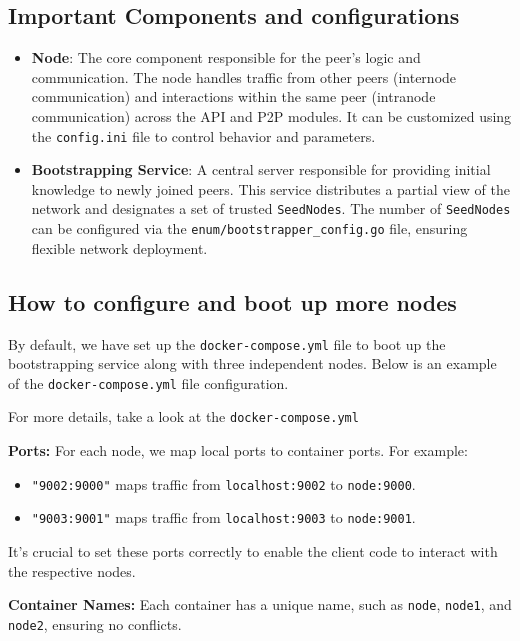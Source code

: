 \subsection{Important Components and configurations}

\begin{itemize}
    \item \textbf{Node}: The core component responsible for the peer's logic and communication. The node handles traffic from other peers (internode communication) and interactions within the same peer (intranode communication) across the API and P2P modules. It can be customized using the \texttt{config.ini} file to control behavior and parameters.

    \item \textbf{Bootstrapping Service}: A central server responsible for providing initial knowledge to newly joined peers. This service distributes a partial view of the network and designates a set of trusted \texttt{SeedNodes}. The number of \texttt{SeedNodes} can be configured via the \texttt{enum/bootstrapper\_config.go} file, ensuring flexible network deployment.
\end{itemize}


\subsection{How to configure and boot up more nodes}
By default, we have set up the \texttt{docker-compose.yml} file to boot up the bootstrapping service along with three independent nodes. Below is an example of the \texttt{docker-compose.yml} file configuration.

For more details, take a look at the \texttt{docker-compose.yml}

 \textbf{Ports:} For each node, we map local ports to container ports. For example:
  \begin{itemize}
    \item \texttt{"9002:9000"} maps traffic from \texttt{localhost:9002} to \texttt{node:9000}.
    \item \texttt{"9003:9001"} maps traffic from \texttt{localhost:9003} to \texttt{node:9001}.
  \end{itemize}
It's crucial to set these ports correctly to enable the client code to interact with the respective nodes.

 \textbf{Container Names:} Each container has a unique name, such as \texttt{node}, \texttt{node1}, and \texttt{node2}, ensuring no conflicts.

